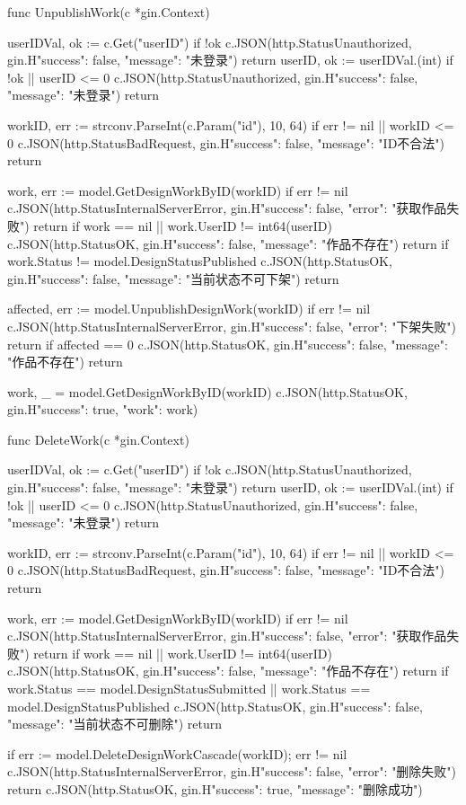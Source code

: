\documentclass[twoside]{thesis-cls-Miya} %
\begin{document}
func UnpublishWork(c *gin.Context) {
	userIDVal, ok := c.Get("userID")
	if !ok {
		c.JSON(http.StatusUnauthorized, gin.H{"success": false, "message": "未登录"})
		return
	}
	userID, ok := userIDVal.(int)
	if !ok || userID <= 0 {
		c.JSON(http.StatusUnauthorized, gin.H{"success": false, "message": "未登录"})
		return
	}

	workID, err := strconv.ParseInt(c.Param("id"), 10, 64)
	if err != nil || workID <= 0 {
		c.JSON(http.StatusBadRequest, gin.H{"success": false, "message": "ID不合法"})
		return
	}

	work, err := model.GetDesignWorkByID(workID)
	if err != nil {
		c.JSON(http.StatusInternalServerError, gin.H{"success": false, "error": "获取作品失败"})
		return
	}
	if work == nil || work.UserID != int64(userID) {
		c.JSON(http.StatusOK, gin.H{"success": false, "message": "作品不存在"})
		return
	}
	if work.Status != model.DesignStatusPublished {
		c.JSON(http.StatusOK, gin.H{"success": false, "message": "当前状态不可下架"})
		return
	}

	affected, err := model.UnpublishDesignWork(workID)
	if err != nil {
		c.JSON(http.StatusInternalServerError, gin.H{"success": false, "error": "下架失败"})
		return
	}
	if affected == 0 {
		c.JSON(http.StatusOK, gin.H{"success": false, "message": "作品不存在"})
		return
	}

	work, _ = model.GetDesignWorkByID(workID)
	c.JSON(http.StatusOK, gin.H{"success": true, "work": work})
}

func DeleteWork(c *gin.Context) {
	userIDVal, ok := c.Get("userID")
	if !ok {
		c.JSON(http.StatusUnauthorized, gin.H{"success": false, "message": "未登录"})
		return
	}
	userID, ok := userIDVal.(int)
	if !ok || userID <= 0 {
		c.JSON(http.StatusUnauthorized, gin.H{"success": false, "message": "未登录"})
		return
	}

	workID, err := strconv.ParseInt(c.Param("id"), 10, 64)
	if err != nil || workID <= 0 {
		c.JSON(http.StatusBadRequest, gin.H{"success": false, "message": "ID不合法"})
		return
	}

	work, err := model.GetDesignWorkByID(workID)
	if err != nil {
		c.JSON(http.StatusInternalServerError, gin.H{"success": false, "error": "获取作品失败"})
		return
	}
	if work == nil || work.UserID != int64(userID) {
		c.JSON(http.StatusOK, gin.H{"success": false, "message": "作品不存在"})
		return
	}
	if work.Status == model.DesignStatusSubmitted || work.Status == model.DesignStatusPublished {
		c.JSON(http.StatusOK, gin.H{"success": false, "message": "当前状态不可删除"})
		return
	}

	if err := model.DeleteDesignWorkCascade(workID); err != nil {
		c.JSON(http.StatusInternalServerError, gin.H{"success": false, "error": "删除失败"})
		return
	}
	c.JSON(http.StatusOK, gin.H{"success": true, "message": "删除成功"})
}
\end{document}
